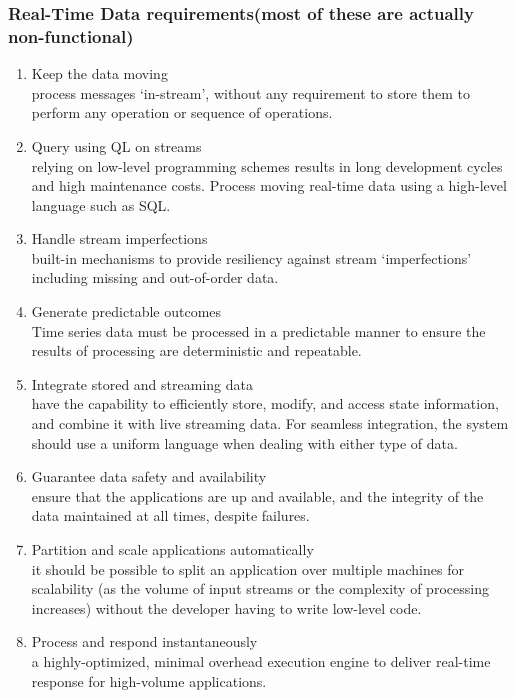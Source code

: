 \subsubsection{Real-Time Data requirements(most of these are actually non-functional)}
\begin{enumerate}
	\item{Keep the data moving\\process messages ‘in-stream’, without any requirement to store them to perform any operation or sequence of operations.}
	\item{Query using QL on streams\\relying on low-level programming schemes results in long development cycles and high maintenance costs. Process moving real-time data using a high-level language such as SQL.}
	\item{Handle stream imperfections\\ built-in mechanisms to provide resiliency against stream ‘imperfections’ including missing and out-of-order data.}
	\item{Generate predictable outcomes\\Time series data must be processed in a predictable manner to ensure the results of processing are deterministic and repeatable.}
	\item{Integrate stored and streaming data\\have the capability to efficiently store, modify, and access state information, and combine it with live streaming data. For seamless integration, the system should use a uniform language when dealing with either type of data.}
	\item{Guarantee data safety and availability\\ ensure that the applications are up and available, and the integrity of the data maintained at all times, despite failures.}
	\item{Partition and scale applications automatically\\ it should be possible to split an application over multiple machines for scalability (as the volume of input streams or the complexity of processing increases) without the developer having to write low-level code.}
	\item{Process and respond instantaneously\\a highly-optimized, minimal overhead execution engine to deliver real-time response for high-volume applications.}
\end{enumerate}